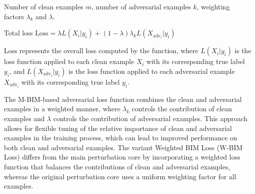 Number of clean examples $m$, 
number of adversarial examples $k$, 
weighting factors $\lambda_k$ and $\lambda$.

Total loss $\text{Loss} = \lambda L(X_i | y_i) + (1-\lambda)\lambda_k L(X_{\text{adv}_i} | y_i)$

$\text{Loss}$ represents the overall loss computed by the function, where $L(X_i | y_i)$ is the loss function applied to each clean example $X_i$ with its corresponding true label $y_i$, and $L(X_{\text{adv}_i} | y_i)$ is the loss function applied to each adversarial example $X_{\text{adv}_i}$ with its corresponding true label $y_i$.

The M-BIM-based adversarial loss function combines the clean and adversarial examples in a weighted manner, where $\lambda_k$ controls the contribution of clean examples and $\lambda$ controls the contribution of adversarial examples. This approach allows for flexible tuning of the relative importance of clean and adversarial examples in the training process, which can lead to improved performance on both clean and adversarial examples. The variant Weighted BIM Loss (W-BIM Loss) differs from the main perturbation core by incorporating a weighted loss function that balances the contributions of clean and adversarial examples, whereas the original perturbation core uses a uniform weighting factor for all examples.